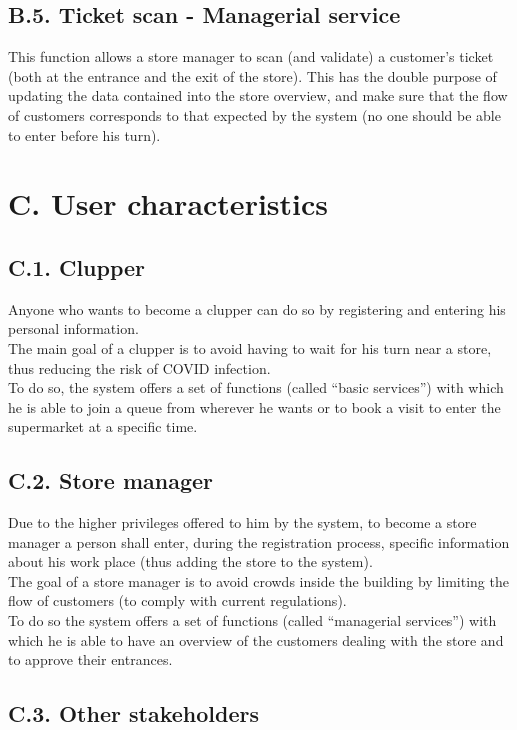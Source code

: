 \clearpage
\subsection{B.5. Ticket scan - Managerial service}

This function allows a store manager to scan (and validate) a customer's ticket (both at the entrance and the exit of the store). This has the double purpose of updating the data contained into the store overview, and make sure that the flow of customers corresponds to that expected by the system (no one should be able to enter before his turn).

\section{C. User characteristics}

\subsection{C.1. Clupper}

Anyone who wants to become a clupper can do so by registering and entering his personal information.\\
The main goal of a clupper is to avoid having to wait for his turn near a store, thus reducing the risk of COVID infection.\\
To do so, the system offers a set of functions (called ``basic services'') with which he is able to join a queue from wherever he wants or to book a visit to enter the supermarket at a specific time.

\subsection{C.2. Store manager}

Due to the higher privileges offered to him by the system, to become a store manager a person shall enter, during the registration process, specific information about his work place (thus adding the store to the system).\\
The goal of a store manager is to avoid crowds inside the building by limiting the flow of customers (to comply with current regulations).\\
To do so the system offers a set of functions (called ``managerial services'') with which he is able to have an overview of the customers dealing with the store and to approve their entrances.

\subsection{C.3. Other stakeholders}

